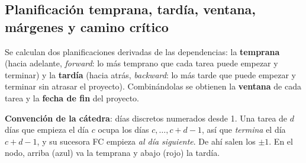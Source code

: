 \documentclass[11pt,a4paper]{article}
\newcommand{\tnode}[9][tarea]{\node[#1,
  label={[temp,anchor=south west,inner sep=1pt]north west:#6},
  label={[temp,anchor=south east,inner sep=1pt]north east:#7},
  label={[tard,anchor=north west,inner sep=1pt]south west:#8},
  label={[tard,anchor=north east,inner sep=1pt]south east:#9}] (#2) at (#3) {\textbf{#4}\hspace{5mm}#5};}
\begin{document}
\subsection{Planificación temprana, tardía, ventana, márgenes y camino crítico}
\label{sec:cpm}
Se calculan dos planificaciones derivadas de las dependencias: la \textbf{temprana} (hacia adelante,
\emph{forward}: lo más temprano que cada tarea puede empezar y terminar) y la \textbf{tardía} (hacia atrás,
\emph{backward}: lo más tarde que puede empezar y terminar sin atrasar el proyecto). Combinándolas se obtienen
la \textbf{ventana} de cada tarea y la \textbf{fecha de fin} del proyecto.

\begin{minipage}[t]{0.6\textwidth}
\textbf{Convención de la cátedra}: días discretos numerados desde 1. Una tarea de $d$ días que empieza el día
$c$ ocupa los días $c, \dots, c + d - 1$, así que \emph{termina} el día $c + d - 1$, y su sucesora FC empieza
\emph{al día siguiente}. De ahí salen los $\pm 1$. En el nodo, arriba (azul) va la temprana y abajo (rojo) la
tardía.
\end{minipage}\hfill
\begin{minipage}[t]{0.36\textwidth}\vspace{4pt}\centering
{}
\end{minipage}
\end{document}
